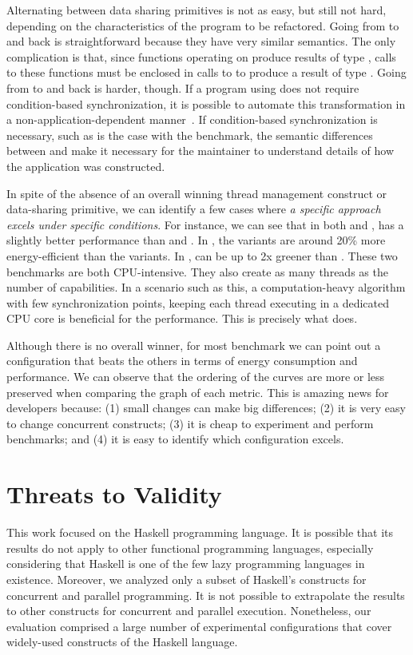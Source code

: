 Alternating between data sharing primitives is not as easy, but still not hard, depending on the characteristics of the program to be refactored. Going from \MVar to \TMVar and back is straightforward because they have very similar semantics. The only complication is that, since functions operating on \TMVar produce results of type \STM, calls to these functions must be enclosed in calls to \atomically to produce a result of type \IO. Going from \MVar to \TVar and back is harder, though. If a program using \MVar does not require condition-based synchronization, it is possible to automate this transformation in a non-application-dependent manner~\cite{soares-neto:2014}. If condition-based synchronization is necessary, such as is the case with the \dining benchmark, the semantic differences between \TVar and \MVar make it necessary for the maintainer to understand details of how the application was constructed.

In spite of the absence of an overall winning thread management construct or data-sharing primitive, we can identify a few cases where \emph{a specific approach excels under specific conditions}. For instance, we can see that in both \mandelbrot and \spectral, \forkOn has a slightly better performance than \forkIO and \forkOS. In \mandelbrot, the \forkOn variants are around 20\% more energy-efficient than the \forkIO variants. In \spectral, \forkOn can be up to 2x greener than \forkOS. These two benchmarks are both CPU-intensive. They also create as many threads as the number of capabilities. In a scenario such as this, a computation-heavy algorithm with few synchronization points, keeping each thread executing in a dedicated CPU core is beneficial for the performance. This is precisely what \forkOn does.

Although there is no overall winner, for most benchmark we can point out a configuration that beats the others in terms of energy consumption and performance. We can observe that the ordering of the curves are more or less preserved when comparing the graph of each metric. This is amazing news for developers because: (1) small changes can make big differences; (2) it is very easy to change concurrent constructs; (3) it is cheap to experiment and perform benchmarks; and (4) it is easy to identify which configuration excels.


\section{Threats to Validity}\label{sec:threats}
This work focused on the Haskell programming language. It is possible that its results do not apply to other functional programming languages, especially considering that Haskell is one of the few lazy programming languages in existence. Moreover, we analyzed only a subset of Haskell's constructs for concurrent and parallel programming. It is not possible to extrapolate the results to other constructs for concurrent and parallel execution. Nonetheless, our evaluation comprised a large number of experimental configurations that cover widely-used constructs of the Haskell language.

